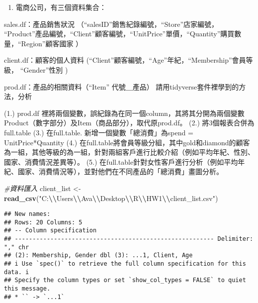 \documentclass[
]{article}
\newenvironment{Shaded}{\begin{snugshade}}{\end{snugshade}}
\newcommand{\CommentTok}[1]{\textcolor[rgb]{0.56,0.35,0.01}{\textit{#1}}}
\newcommand{\FunctionTok}[1]{\textcolor[rgb]{0.13,0.29,0.53}{\textbf{#1}}}
\newcommand{\NormalTok}[1]{#1}
\newcommand{\OtherTok}[1]{\textcolor[rgb]{0.56,0.35,0.01}{#1}}
\newcommand{\SpecialCharTok}[1]{\textcolor[rgb]{0.81,0.36,0.00}{\textbf{#1}}}
\newcommand{\StringTok}[1]{\textcolor[rgb]{0.31,0.60,0.02}{#1}}
\providecommand{\tightlist}{%
  \setlength{\itemsep}{0pt}\setlength{\parskip}{0pt}}
\begin{document}
\begin{enumerate}
\def\labelenumi{\arabic{enumi}.}
\setcounter{enumi}{1}
\tightlist
\item
  電商公司，有三個資料集合：
\end{enumerate}

sales.df：產品銷售狀況 （``salesID''銷售紀錄編號，``Store''店家編號，
``Product''產品編號，``Client''顧客編號，``UnitPrice''單價，``Quantity''購買數量，``Region''顧客國家
）

client.df：顧客的個人資料
(``Client''顧客編號，``Age''年紀，``Membership''會員等級，
``Gender''性別 )

prod.df：產品的相關資料（``Item'' 代號＿產品）
請用tidyverse套件裡學到的方法，分析

(1.) prod.df
裡將兩個變數，誤紀錄為在同一個column，其將其分開為兩個變數Product（數字部分）及Item（商品部分），取代原prod.df。
(2.) 將3個報表合併為full.table (3.) 在full.table.
新增一個變數「總消費」為spend = UnitPrice*Quantity (4.)
在full.table將會員等級分組，其中gold和diamond的顧客為一組，其他等級的為一組，針對兩組客戶進行比較介紹（例如平均年紀、性別、國家、消費情況差異等）。
(5.)
在full.table針對女性客戶進行分析（例如平均年紀、國家、消費情況等），並對他們在不同產品的「總消費」畫圖分析。

\begin{Shaded}
\begin{Highlighting}[]
\CommentTok{\#資料匯入}
\NormalTok{client\_list }\OtherTok{\textless{}{-}} \FunctionTok{read\_csv}\NormalTok{(}\StringTok{"C:}\SpecialCharTok{\textbackslash{}\textbackslash{}}\StringTok{Users}\SpecialCharTok{\textbackslash{}\textbackslash{}}\StringTok{Ava}\SpecialCharTok{\textbackslash{}\textbackslash{}}\StringTok{Desktop}\SpecialCharTok{\textbackslash{}\textbackslash{}}\StringTok{R}\SpecialCharTok{\textbackslash{}\textbackslash{}}\StringTok{HW1}\SpecialCharTok{\textbackslash{}\textbackslash{}}\StringTok{client\_list.csv"}\NormalTok{)}
\end{Highlighting}
\end{Shaded}

\begin{verbatim}
## New names:
## Rows: 20 Columns: 5
## -- Column specification
## -------------------------------------------------------- Delimiter: "," chr
## (2): Membership, Gender dbl (3): ...1, Client, Age
## i Use `spec()` to retrieve the full column specification for this data. i
## Specify the column types or set `show_col_types = FALSE` to quiet this message.
## * `` -> `...1`
\end{verbatim}
\end{document}
